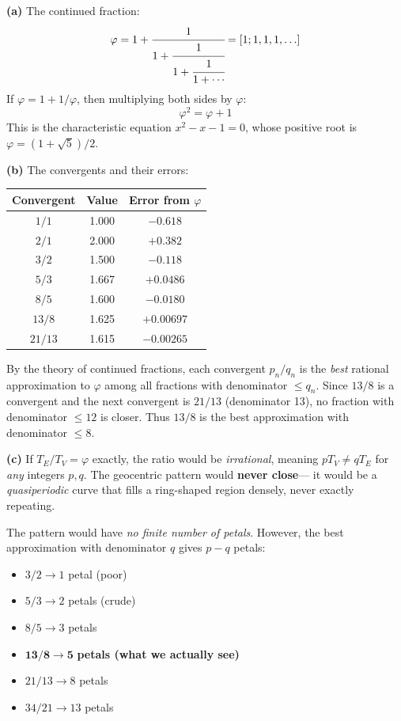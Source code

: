 \documentclass[11pt,letterpaper]{article}
\begin{document}
\begin{challengesolution}
\textbf{(a)} The continued fraction:
\[
  \varphi = 1 + \cfrac{1}{1 + \cfrac{1}{1 + \cfrac{1}{1 + \cdots}}}
  = [1; 1, 1, 1, \ldots]
\]
If $\varphi = 1 + 1/\varphi$, then multiplying both sides by $\varphi$:
\[
  \varphi^2 = \varphi + 1
\]
This is the characteristic equation $x^2 - x - 1 = 0$, whose positive
root is $\varphi = (1+\sqrt{5})/2$. \checkmark

\textbf{(b)} The convergents and their errors:
\begin{center}
\begin{tabular}{ccc}
  \toprule
  Convergent & Value & Error from $\varphi$ \\
  \midrule
  $1/1$ & 1.000 & $-0.618$ \\
  $2/1$ & 2.000 & $+0.382$ \\
  $3/2$ & 1.500 & $-0.118$ \\
  $5/3$ & 1.667 & $+0.0486$ \\
  $8/5$ & 1.600 & $-0.0180$ \\
  $13/8$ & 1.625 & $+0.00697$ \\
  $21/13$ & 1.615 & $-0.00265$ \\
  \bottomrule
\end{tabular}
\end{center}

By the theory of continued fractions, each convergent $p_n/q_n$
is the \textit{best} rational approximation to $\varphi$ among
all fractions with denominator $\leq q_n$. Since $13/8$ is a
convergent and the next convergent is $21/13$ (denominator 13),
no fraction with denominator $\leq 12$ is closer. Thus $13/8$ is
the best approximation with denominator $\leq 8$. \checkmark

\textbf{(c)} If $T_E / T_V = \varphi$ exactly, the ratio would be
\textit{irrational}, meaning $p T_V \neq q T_E$ for \textit{any}
integers $p, q$. The geocentric pattern would \textbf{never close}—
it would be a \textit{quasiperiodic} curve that fills a ring-shaped
region densely, never exactly repeating.

The pattern would have \textit{no finite number of petals}. However,
the best approximation with denominator $q$ gives $p - q$ petals:
\begin{itemize}[nosep]
  \item $3/2 \to 1$ petal (poor)
  \item $5/3 \to 2$ petals (crude)
  \item $8/5 \to 3$ petals
  \item $\mathbf{13/8 \to 5}$ \textbf{petals (what we actually see)}
  \item $21/13 \to 8$ petals
  \item $34/21 \to 13$ petals
\end{itemize}


\end{challengesolution}
\end{document}
